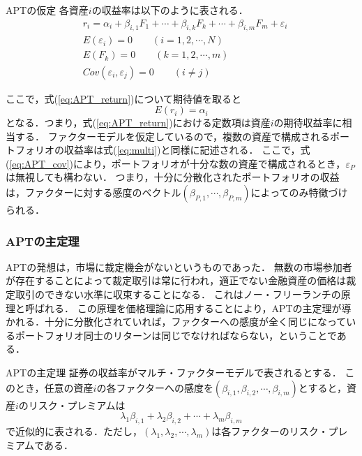﻿\documentclass[a4paper]{jarticle}
\begin{document}
\begin{itembox}[l]{APTの仮定}
各資産$i$の収益率は以下のように表される．
\begin{eqnarray}
& r_i = \alpha_i + \beta_{i,1}F_1 + \cdots + \beta_{i,k}F_k + \cdots + \beta_{i,m}F_m + \varepsilon_i\label{eq:APT_return} \\
& E(\varepsilon_i) = 0 \qquad (i=1,2,\cdots,N)\\
& E(F_k) = 0 \qquad (k=1,2,\cdots,m)\\
& Cov(\varepsilon_i, \varepsilon_j) = 0 \qquad (i \neq j) \label{eq:APT_cov}
\end{eqnarray}
\end{itembox}
ここで，式(\ref{eq:APT_return})について期待値を取ると
\begin{equation}
E(r_i) = \alpha_i
\end{equation}
となる．つまり，式(\ref{eq:APT_return})における定数項は資産$i$の期待収益率に相当する．
ファクターモデルを仮定しているので，複数の資産で構成されるポートフォリオの収益率は式(\ref{eq:multi})と同様に記述される．
ここで，式(\ref{eq:APT_cov})により，ポートフォリオが十分な数の資産で構成されるとき，$\varepsilon_P$は無視しても構わない．
つまり，十分に分散化されたポートフォリオの収益は，ファクターに対する感度のベクトル$(\beta_{P,1},\cdots,\beta_{P,m})$によってのみ特徴づけられる．




\subsubsection{APTの主定理}
APTの発想は，市場に裁定機会がないというものであった．
無数の市場参加者が存在することによって裁定取引は常に行われ，適正でない金融資産の価格は裁定取引のできない水準に収束することになる．
これはノー・フリーランチの原理と呼ばれる．
この原理を価格理論に応用することにより，APTの主定理が導かれる．十分に分散化されていれば，ファクターへの感度が全く同じになっているポートフォリオ同士のリターンは同じでなければならない，ということである．

\begin{itembox}[l]{APTの主定理}
証券の収益率がマルチ・ファクターモデルで表されるとする．
このとき，任意の資産$i$の各ファクターへの感度を$(\beta_{i,1},\beta_{i,2},\cdots,\beta_{i,m})$とすると，資産$i$のリスク・プレミアムは
\begin{equation}
\lambda_1\beta_{i,1} + \lambda_2\beta_{i,2} + \cdots + \lambda_m\beta_{i,m}
\label{eq:APT}
\end{equation}
で近似的に表される．ただし，$( \lambda_1, \lambda_2, \cdots ,\lambda_m )$は各ファクターのリスク・プレミアムである．
\end{itembox}
\end{document}
